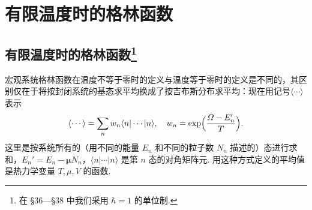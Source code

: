 \chapter{有限温度时的格林函数}

\section[有限温度时的格林函数]{有限温度时的格林函数\footnote{在 §36—§38 中我们采用 $\hbar=1$ 的单位制.}}

宏观系统格林函数在温度不等于零时的定义与温度等于零时的定义是不同的，其区别仅在于将按封闭系统的基态求平均换成了按吉布斯分布求平均：现在用记号$\langle\cdots\rangle$表示
\begin{equation}
\langle\cdots\rangle=\sum_{n}w_n\langle n|\cdots|n\rangle,\quad
w_n=\exp\Bigl(\frac{\varOmega-E_n'}{T}\Bigr).
\label{36.1}
\end{equation}
这里是按系统所有的（用不同的能量 $E_n$ 和不同的粒子数 $N_n$ 描述的）态进行求和，$E_n'=E_n-\bm\mu N_n$，$\langle n|\cdots|n\rangle$ 是第 $n$ 态的对角矩阵元. 用这种方式定义的平均值是热力学变量 $T,\mu,V$ 的函数.

